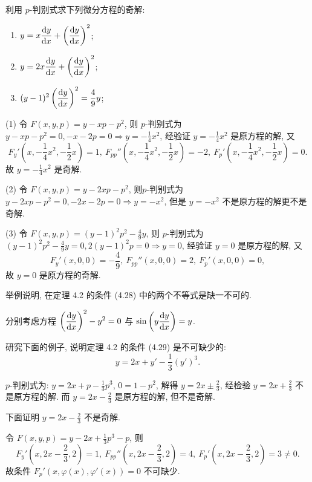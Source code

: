 \begin{exercise}
  利用 $p$-判别式求下列微分方程的奇解:
  \begin{enumerate}[(1)]
  \item $\displaystyle y=x\frac{\mathop{}\!\mathrm{d} y}{\mathop{}\!\mathrm{d} x}+\left(\frac{\mathop{}\!\mathrm{d} y}{\mathop{}\!\mathrm{d} x}\right)^2$;
  \item $\displaystyle y=2x\frac{\mathop{}\!\mathrm{d} y}{\mathop{}\!\mathrm{d} x}+\left(\frac{\mathop{}\!\mathrm{d} y}{\mathop{}\!\mathrm{d} x}\right)^2$;
  \item $\displaystyle (y-1)^2\left(\frac{\mathop{}\!\mathrm{d} y}{\mathop{}\!\mathrm{d} x}\right)^2=\frac{4}{9}y$;
  \end{enumerate}
\end{exercise}

\begin{solve} 
  (1) 令 $F(x,y,p)=y-xp-p^2$, 则 $p$-判别式为
  $y-xp-p^2=0,-x-2p=0\Rightarrow y=-\frac{1}{4}x^2$, 经验证 $y=-\frac{1}{4}x^2$ 是原方程的解, 又
  \[F_y'\left(x,-\frac{1}{4}x^2,-\frac{1}{2}x\right)=1,\:
    F_{pp}''\left(x,-\frac{1}{4}x^2,-\frac{1}{2}x\right)=-2,\:
    F_p'\left(x,-\frac{1}{4}x^2,-\frac{1}{2}x\right)=0.\]
  故 $y=-\frac{1}{4}x^2$ 是奇解.

  (2) 令 $F(x,y,p)=y-2xp-p^2$, 则$p$-判别式为$y-2xp-p^2=0,-2x-2p=0\Rightarrow y=-x^2$,
  但是 $y=-x^2$ 不是原方程的解更不是奇解.

  (3) 令 $F(x,y,p)=(y-1)^2p^2-\frac{4}{9}y$, 
  则 $p$-判别式为 $(y-1)^2p^2-\frac{4}{9}y=0,2(y-1)^2p=0\Rightarrow y=0$, 
  经验证 $y=0$ 是原方程的解, 又
  \[F_y'(x,0,0)=-\frac{4}{9},\: F_{pp}''(x,0,0)=2,\: F_p'(x,0,0)=0,\]
  故 $y=0$ 是原方程的奇解.
\end{solve}



\begin{exercise}
  举例说明, 在定理 4.2 的条件 (4.28) 中的两个不等式是缺一不可的.
\end{exercise}

\begin{solve}  
  分别考虑方程 $\displaystyle\left(\frac{\mathop{}\!\mathrm{d} y}{\mathop{}\!\mathrm{d} x}\right)^2-y^2=0$
  与 $\displaystyle\sin\left(y\frac{\mathop{}\!\mathrm{d} y}{\mathop{}\!\mathrm{d} x}\right)=y$.
\end{solve}



\begin{exercise}
  研究下面的例子, 说明定理 4.2 的条件 (4.29) 是不可缺少的:
  \[y=2x+y'-\frac{1}{3}(y')^3.\]
\end{exercise}

\begin{solve} 
  $p$-判别式为: $y=2x+p-\frac{1}{3}p^3$, $0 = 1-p^2$, 解得 $y = 2x\pm\frac{2}{3}$, 
  经检验 $y=2x+\frac{2}{3}$ 不是原方程的解. 而 $y=2x-\frac{2}{3}$ 是原方程的解, 但不是奇解.

  下面证明 $y = 2x - \frac23$ 不是奇解.

  令 $F(x,y,p) = y-2x+\frac{1}{3}p^3-p$, 则
  \[F_y'\left(x,2x-\frac{2}{3},2\right)=1,\:
    F_{pp}''\left(x,2x-\frac{2}{3},2\right)=4,\:
    F_p'\left(x,2x-\frac{2}{3},2\right)=3\neq 0.\]
  故条件 $F_p'(x,\varphi(x),\varphi'(x))=0$ 不可缺少.
\end{solve}



